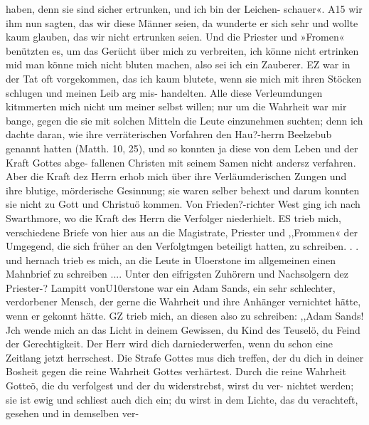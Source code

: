 haben, denn sie sind sicher ertrunken, und ich bin der Leichen-
schauer«. A15 wir ihm nun sagten, das wir diese Männer seien,
da wunderte er sich sehr und wollte kaum glauben, das wir nicht
ertrunken seien. Und die Priester und »Fromen« benützten es, um
das Gerücht über mich zu verbreiten, ich könne nicht ertrinken mid
man könne mich nicht bluten machen, also sei ich ein Zauberer.
EZ war in der Tat oft vorgekommen, das ich kaum blutete, wenn
sie mich mit ihren Stöcken schlugen und meinen Leib arg mis-
handelten. Alle diese Verleumdungen kitmmerten mich nicht um
meiner selbst willen; nur um die Wahrheit war mir bange,
gegen die sie mit solchen Mitteln die Leute einzunehmen suchten;
denn ich dachte daran, wie ihre verräterischen Vorfahren den
Hau?-herrn Beelzebub genannt hatten (Matth. 10, 25), und so
konnten ja diese von dem Leben und der Kraft Gottes abge-
fallenen Christen mit seinem Samen nicht andersz verfahren. Aber
die Kraft dez Herrn erhob mich über ihre Verläumderischen Zungen
und ihre blutige, mörderische Gesinnung; sie waren selber behext
und darum konnten sie nicht zu Gott und Christuö kommen.
Von Frieden?-richter West ging ich nach Swarthmore, wo
die Kraft des Herrn die Verfolger niederhielt. ES trieb mich,
verschiedene Briefe von hier aus an die Magistrate, Priester und
,,Frommen« der Umgegend, die sich früher an den Verfolgtmgen
beteiligt hatten, zu schreiben. . . und hernach trieb es mich, an
die Leute in Uloerstone im allgemeinen einen Mahnbrief zu
schreiben ....
Unter den eifrigsten Zuhörern und Nachsolgern dez Priester-?
Lampitt vonU10erstone war ein Adam Sands, ein sehr schlechter,
verdorbener Mensch, der gerne die Wahrheit und ihre Anhänger
vernichtet hätte, wenn er gekonnt hätte. GZ trieb mich, an diesen
also zu schreiben:
,,Adam Sands!
Jch wende mich an das Licht in deinem Gewissen, du Kind
des Teuselö, du Feind der Gerechtigkeit. Der Herr wird dich
darniederwerfen, wenn du schon eine Zeitlang jetzt herrschest. Die
Strafe Gottes mus dich treffen, der du dich in deiner Bosheit gegen
die reine Wahrheit Gottes verhärtest. Durch die reine Wahrheit
Gotteö, die du verfolgest und der du widerstrebst, wirst du ver-
nichtet werden; sie ist ewig und schliest auch dich ein; du wirst
in dem Lichte, das du verachteft, gesehen und in demselben ver-


